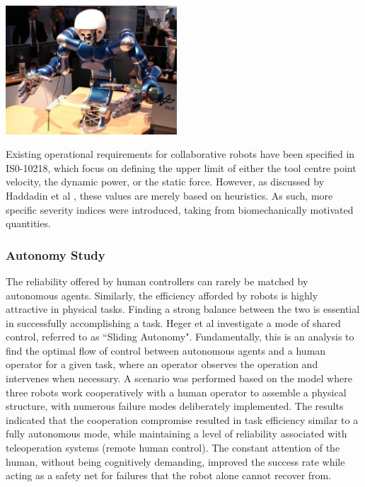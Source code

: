 \documentclass[11pt]{article}
\begin{document}
\begin{center}
\includegraphics[width=0.48\textwidth]{humanoid.png}
\label{figure:humanoid}
\end{center}

Existing operational requirements for collaborative robots have been specified in IS0-10218, which focus on defining the upper limit of either the tool centre point velocity, the dynamic power, or the static force. However, as discussed by Haddadin et al \cite{Haddadin2007}, these values are merely based on heuristics. As such, more specific severity indices were introduced, taking from biomechanically motivated quantities.

\subsubsection{Autonomy Study}
The reliability offered by human controllers can rarely be matched by autonomous agents. Similarly, the efficiency afforded by robots is highly attractive in physical tasks. Finding a strong balance between the two is essential in successfully accomplishing a task. Heger et al \cite{heger2006} investigate a mode of shared control, referred to as ``Sliding Autonomy". Fundamentally, this is an analysis to find the optimal flow of control between autonomous agents and a human operator for a given task, where an operator observes the operation and intervenes when necessary. A scenario was performed based on the model where three robots work cooperatively with a human operator to assemble a physical structure, with numerous failure modes deliberately implemented. The results indicated that the cooperation compromise resulted in task efficiency similar to a fully autonomous mode, while maintaining a level of reliability associated with teleoperation systems (remote human control). The constant attention of the human, without being cognitively demanding, improved the success rate while acting as a safety net for failures that the robot alone cannot recover from.
\end{document}

